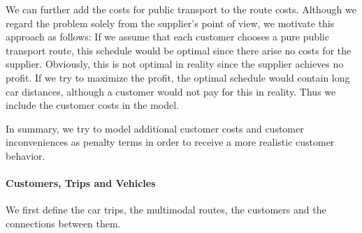 We can further add the costs for public transport to the route costs. Although we regard the problem solely from the supplier's point of view, we motivate this approach as follows: If we assume that each customer chooses a pure public transport route, this schedule would be optimal since there arise no costs for the supplier. Obviously, this is not optimal in reality since the supplier achieves no profit. If we try to maximize the profit, the optimal schedule would contain long car distances, although a customer would not pay for this in reality. Thus we include the customer costs in the model.

In summary, we try to model additional customer costs and customer inconveniences as penalty terms in order to receive a more realistic customer behavior.

\paragraph{Customers, Trips and Vehicles} \parfill

We first define the car trips, the multimodal routes, the customers and the connections between them. 

